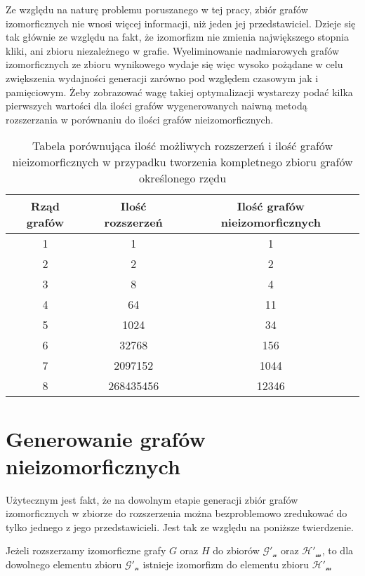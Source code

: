  Ze względu na naturę problemu poruszanego w tej pracy, zbiór grafów izomorficznych nie wnosi więcej informacji, niż jeden jej przedstawiciel. Dzieje się tak głównie ze względu na fakt, że izomorfizm nie zmienia największego stopnia kliki, ani zbioru niezależnego w grafie. Wyeliminowanie nadmiarowych grafów izomorficznych ze zbioru wynikowego wydaje się więc wysoko pożądane w celu zwiększenia wydajności generacji zarówno pod względem czasowym jak i pamięciowym. Żeby zobrazować wagę takiej optymalizacji wystarczy podać kilka pierwszych wartości dla ilości grafów wygenerowanych naiwną metodą rozszerzania w porównaniu do ilości grafów nieizomorficznych.
 \begin{table}[H]
 \begin{center}
 \begin{tabular}{|c c c|} 
 \hline
 Rząd grafów & Ilość rozszerzeń\cite{OEIS2} & Ilość grafów nieizomorficznych\cite{OEIS}  \\ 
 \hline\hline
 1 & 1 & 1  \\ 
 \hline
 2 & 2 & 2  \\
 \hline
 3 & 8 & 4  \\
 \hline
 4 & 64 & 11  \\
 \hline
 5 & 1024 & 34  \\
 \hline
 6 & 32768 & 156  \\
 \hline
 7 & 2097152 & 1044  \\
 \hline
 8 & 268435456 & 12346  \\
 \hline
\end{tabular}
\end{center}
 \caption{Tabela porównująca ilość możliwych rozszerzeń i ilość grafów nieizomorficznych w przypadku tworzenia kompletnego zbioru grafów określonego rzędu}
 \end{table}

\section{Generowanie grafów nieizomorficznych}
Użytecznym jest fakt, że na dowolnym etapie generacji zbiór grafów izomorficznych w zbiorze do rozszerzenia można bezproblemowo zredukować do tylko jednego z jego przedstawicieli. Jest tak ze względu na poniższe twierdzenie.
\begin{theorem}
Jeżeli rozszerzamy izomorficzne grafy $G$ oraz $H$ do zbiorów $\mathcal{G'_n}$ oraz $\mathcal{H'_m}$, to dla dowolnego elementu zbioru $\mathcal{G'_n}$ istnieje izomorfizm do elementu zbioru $\mathcal{H'_m}$
\end{theorem}


